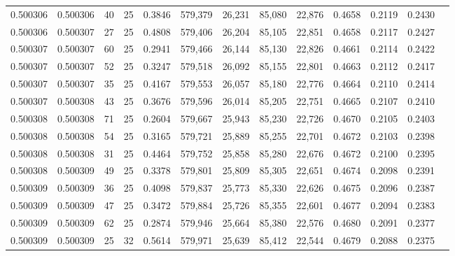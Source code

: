 \begin{tabular}{rrrrrrrrrrrrr}
0.500306 & 0.500306 &    40 &  25 &                                     0.3846 & 579,379 &  26,231 &  85,080 &  22,876 & 0.4658 & 0.2119 & 0.2430 \\
0.500306 & 0.500307 &    27 &  25 &                                     0.4808 & 579,406 &  26,204 &  85,105 &  22,851 & 0.4658 & 0.2117 & 0.2427 \\
0.500307 & 0.500307 &    60 &  25 &                                     0.2941 & 579,466 &  26,144 &  85,130 &  22,826 & 0.4661 & 0.2114 & 0.2422 \\
0.500307 & 0.500307 &    52 &  25 &                                     0.3247 & 579,518 &  26,092 &  85,155 &  22,801 & 0.4663 & 0.2112 & 0.2417 \\
0.500307 & 0.500307 &    35 &  25 &                                     0.4167 & 579,553 &  26,057 &  85,180 &  22,776 & 0.4664 & 0.2110 & 0.2414 \\
0.500307 & 0.500308 &    43 &  25 &                                     0.3676 & 579,596 &  26,014 &  85,205 &  22,751 & 0.4665 & 0.2107 & 0.2410 \\
0.500308 & 0.500308 &    71 &  25 &                                     0.2604 & 579,667 &  25,943 &  85,230 &  22,726 & 0.4670 & 0.2105 & 0.2403 \\
0.500308 & 0.500308 &    54 &  25 &                                     0.3165 & 579,721 &  25,889 &  85,255 &  22,701 & 0.4672 & 0.2103 & 0.2398 \\
0.500308 & 0.500308 &    31 &  25 &                                     0.4464 & 579,752 &  25,858 &  85,280 &  22,676 & 0.4672 & 0.2100 & 0.2395 \\
0.500308 & 0.500309 &    49 &  25 &                                     0.3378 & 579,801 &  25,809 &  85,305 &  22,651 & 0.4674 & 0.2098 & 0.2391 \\
0.500309 & 0.500309 &    36 &  25 &                                     0.4098 & 579,837 &  25,773 &  85,330 &  22,626 & 0.4675 & 0.2096 & 0.2387 \\
0.500309 & 0.500309 &    47 &  25 &                                     0.3472 & 579,884 &  25,726 &  85,355 &  22,601 & 0.4677 & 0.2094 & 0.2383 \\
0.500309 & 0.500309 &    62 &  25 &                                     0.2874 & 579,946 &  25,664 &  85,380 &  22,576 & 0.4680 & 0.2091 & 0.2377 \\
0.500309 & 0.500309 &    25 &  32 &                                     0.5614 & 579,971 &  25,639 &  85,412 &  22,544 & 0.4679 & 0.2088 & 0.2375 \\

\end{tabular}
